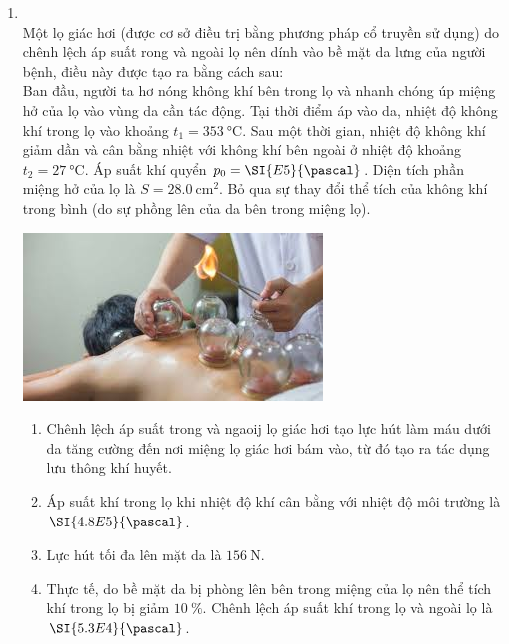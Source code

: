 \begin{enumerate}[label=\bfseries Câu \arabic*:, leftmargin=1.7cm]
\item {}\\
Một lọ giác hơi (được cơ sở điều trị bằng phương pháp cổ truyền sử dụng) do chênh lệch áp suất rong và ngoài lọ nên dính vào bề mặt da lưng của người bệnh, điều này được tạo ra bằng cách sau:\\
Ban đầu, người ta hơ nóng không khí bên trong lọ và nhanh chóng úp miệng hở của lọ vào vùng da cần tác động. Tại thời điểm áp vào da, nhiệt độ không khí trong lọ vào khoảng $t_1=\SI{353}{\celsius}$. Sau một thời gian, nhiệt độ không khí giảm dần và cân bằng nhiệt với không khí bên ngoài ở nhiệt độ khoảng $t_2=\SI{27}{\celsius}$. Áp suất khí quyển $p_0=\SI{E5}{\pascal}$. Diện tích phần miệng hở của lọ là $S=\SI{28.0}{\centi\meter^2}$. Bỏ qua sự thay đổi thể tích của không khí trong bình (do sự phồng lên của da bên trong miệng lọ).
\begin{center}
	\includegraphics[width=0.35\linewidth]{../figs/VN12-Y24-PH-SYL-012P-8}
\end{center}
\begin{enumerate}[label=\alph*)]
	\item Chênh lệch áp suất trong và ngaoij lọ giác hơi tạo lực hút làm máu dưới da tăng cường đến nơi miệng lọ giác hơi bám vào, từ đó tạo ra tác dụng lưu thông khí huyết.
	\item Áp suất khí trong lọ khi nhiệt độ khí cân bằng với nhiệt độ môi trường là $\SI{4.8E5}{\pascal}$.
	\item Lực hút tối đa lên mặt da là $\SI{156}{\newton}$.
	\item Thực tế, do bề mặt da bị phòng lên bên trong miệng của lọ nên thể tích khí trong lọ bị giảm $\SI{10}{\percent}$. Chênh lệch áp suất khí trong lọ và ngoài lọ là $\SI{5.3E4}{\pascal}$.
\end{enumerate}



\end{enumerate}
